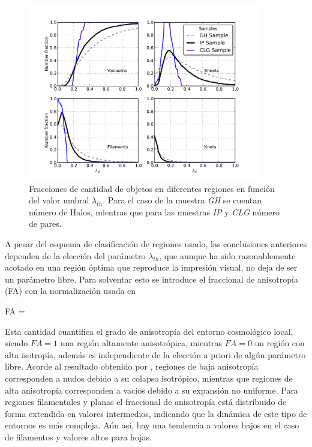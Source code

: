 \
\begin{figure}[htbp]
	\centering
	\includegraphics[trim = 8mm 5mm 12mm 12mm, clip, width=0.9\textwidth]
	{./figures/4_results/CLG_Classification_Env.pdf}
	
	\caption{\small{Fracciones de cantidad de objetos en diferentes
	regiones en función del valor umbral $\lambda_{th}$. Para el caso de 
	la muestra \textit{GH} se cuentan número de Halos, mientras que para
	las muestras \textit{IP} y \textit{CLG} número de pares.}}
	\label{fig:Samples_Fraction}
\end{figure}


A pesar del esquema de clasificación de regiones usado, las conclusiones 
anteriores dependen de la elección del parámetro $\lambda_{th}$, que aunque
ha sido razonablemente acotado en una región óptima que reproduce la 
impresión visual, no deja de ser un parámetro libre. Para solventar esto se 
introduce el fraccional de anisotropía (FA) con la normalización usada en
\cite{libeskind2013}


{ FA = \sqrt{ \frac{ (\lambda_1 - \lambda_3)^2 + 
(\lambda_2 - \lambda_3)^2 + (\lambda_1 - \lambda_2)^2}{ \lambda_1^2 + 
\lambda_2^2 + \lambda_3^2} } }


Esta cantidad cuantifica el grado de anisotropía del entorno cosmológico
local, siendo $FA = 1$ una región altamente anisotrópica, mientras
$FA = 0$ un región con alta isotropía, además es independiente de la
elección a priori de algún parámetro libre. Acorde al resultado obtenido por
\cite{libeskind2013}, regiones de baja anisotropía corres\-ponden a nudos
debido a su colapso isotrópico, mientras que regiones de alta anisotropía 
corresponden a vacíos debido a su expansión no uniforme. Para regiones
filamentales y planas el fraccional de anisotropía está distribuido 
de forma extendida en valores intermedios, indicando que la dinámica de
este tipo de entornos es más compleja. Aún así, hay una tendencia a valores
bajos en el caso de filamentos y valores altos para hojas.


